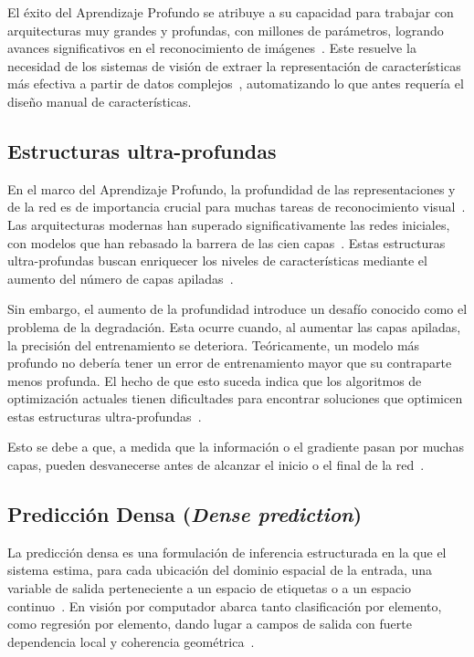 El éxito del Aprendizaje Profundo se atribuye a su capacidad para trabajar con arquitecturas muy grandes y profundas, con millones de parámetros, logrando avances significativos en el reconocimiento de imágenes~\cite{ronneberger2015unet, diezpastora2025trails, neloy2024autoencoders, he2016resnet}. 
Este resuelve la necesidad de los sistemas de visión de extraer la representación de características más efectiva a partir de datos complejos~\cite{neloy2024autoencoders}, automatizando lo que antes requería el diseño manual de características.

\subsection{Estructuras ultra-profundas}
En el marco del Aprendizaje Profundo, la profundidad de las representaciones y de la red es de importancia crucial para muchas tareas de reconocimiento visual~\cite{he2016resnet, huang2018densenet}. Las arquitecturas modernas han superado significativamente las redes iniciales, con modelos que han rebasado la barrera de las cien capas~\cite{huang2018densenet}. Estas estructuras ultra-profundas buscan enriquecer los niveles de características mediante el aumento del número de capas apiladas~\cite{he2016resnet, huang2018densenet}.

Sin embargo, el aumento de la profundidad introduce un desafío conocido como el problema de la degradación. Esta ocurre cuando, al aumentar las capas apiladas, la precisión del entrenamiento se deteriora. Teóricamente, un modelo más profundo no debería tener un error de entrenamiento mayor que su contraparte menos profunda. El hecho de que esto suceda indica que los algoritmos de optimización actuales tienen dificultades para encontrar soluciones que optimicen estas estructuras ultra-profundas~\cite{he2016resnet}. 

Esto se debe a que, a medida que la información o el gradiente pasan por muchas capas, pueden desvanecerse antes de alcanzar el inicio o el final de la red~\cite{huang2018densenet}.

\subsection{Predicción Densa (\textit{Dense prediction})}
La predicción densa es una formulación de inferencia estructurada en la que el sistema estima, para cada ubicación del dominio espacial de la entrada, una variable de salida perteneciente a un espacio de etiquetas o a un espacio continuo~\cite{zhang2022constructionautomation}. En visión por computador abarca tanto clasificación por elemento, como regresión por elemento, dando lugar a campos de salida con fuerte dependencia local y coherencia geométrica~\cite{zhao2017pspnet, lin2017fpn}. 


